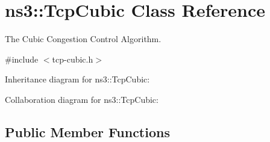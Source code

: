\hypertarget{classns3_1_1TcpCubic}{}\section{ns3\+:\+:Tcp\+Cubic Class Reference}
\label{classns3_1_1TcpCubic}


The Cubic Congestion Control Algorithm.  




{\ttfamily \#include $<$tcp-\/cubic.\+h$>$}



Inheritance diagram for ns3\+:\+:Tcp\+Cubic\+:


Collaboration diagram for ns3\+:\+:Tcp\+Cubic\+:
\subsection*{Public Member Functions}

